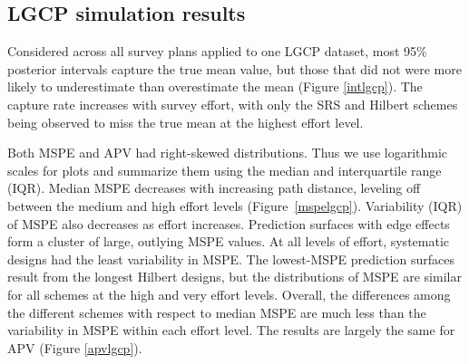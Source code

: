 \documentclass[review]{elsarticle}
\begin{document}
\subsection{LGCP simulation results}

Considered across all survey plans applied to one LGCP dataset, most
95\% posterior intervals capture the true mean value, but those that did not
were more likely to underestimate than overestimate the mean (Figure
\ref{intlgcp}). The capture rate increases with survey effort, with only
the SRS and Hilbert schemes being observed to miss the true mean at the
highest effort level.

Both MSPE and APV had right-skewed distributions. Thus we use logarithmic
scales for plots and summarize them using the median and interquartile range
(IQR). Median MSPE decreases with increasing path distance, leveling off
between the medium and high effort levels (Figure~\ref{mspelgcp}). Variability
(IQR) of MSPE also decreases as effort increases. Prediction surfaces with edge
effects form a cluster of large, outlying MSPE values. At all levels of effort,
systematic designs had the least variability in MSPE. The lowest-MSPE
prediction surfaces result from the longest Hilbert designs, but the
distributions of MSPE are similar for all schemes at the high and very effort
levels. Overall, the differences among the different schemes with respect to
median MSPE are much less than the variability in MSPE within each effort
level. The results are largely the same for APV (Figure \ref{apvlgcp}).



\end{document}

